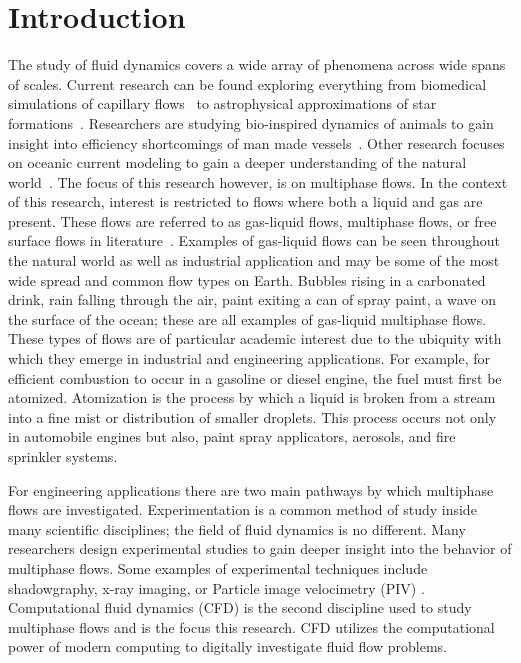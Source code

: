 \chapter{Introduction}\label{CH:introduction}


The study of fluid dynamics covers a wide array of phenomena across wide spans of scales. Current research can be found exploring everything from biomedical simulations of capillary flows~\cite{biomed} to astrophysical approximations of star formations~\cite{star}. Researchers are studying bio-inspired dynamics of animals to gain insight into efficiency shortcomings of man made vessels~\cite{fish}. Other research focuses on oceanic current modeling to gain a deeper understanding of the natural world~\cite{ocean}. The focus of this research however, is on multiphase flows. In the context of this research, interest is restricted to flows where both a liquid and gas are present. These flows are referred to as gas-liquid flows, multiphase flows, or free surface flows in literature~\cite{gasliq,freesurf,TRYG}. Examples of gas-liquid flows can be seen throughout the natural world as well as industrial application and may be some of the most wide spread and common flow types on Earth. Bubbles rising in a carbonated drink, rain falling through the air, paint exiting a can of spray paint, a wave on the surface of the ocean; these are all examples of gas-liquid multiphase flows. These types of flows are of particular academic interest due to the ubiquity with which they emerge in industrial and engineering applications. For example,  for efficient combustion to occur in a gasoline or diesel engine, the fuel must first be atomized. Atomization is the process by which a liquid is broken from a stream into a fine mist or distribution of smaller droplets. This process occurs not only in automobile engines but also, paint spray applicators, aerosols, and fire sprinkler systems. 


For engineering applications there are two main pathways by which multiphase flows are investigated. Experimentation is a common method of study inside many scientific disciplines; the field of fluid dynamics is no different. Many researchers design experimental studies to gain deeper insight into the behavior of multiphase flows. Some examples of experimental techniques include shadowgraphy, x-ray imaging, or Particle image velocimetry (PIV) \cite{piv,xray,shadow}. Computational fluid dynamics (CFD) is the second discipline used to study multiphase flows and is the focus this research.  CFD utilizes the computational power of modern computing to digitally investigate fluid flow problems. 


